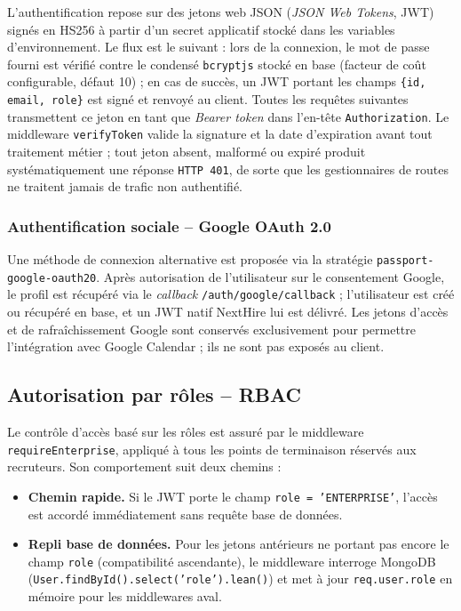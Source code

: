 L'authentification repose sur des jetons web JSON (\textit{JSON Web Tokens}, JWT) signés en
HS256 à partir d'un secret applicatif stocké dans les variables d'environnement. Le flux est le
suivant : lors de la connexion, le mot de passe fourni est vérifié contre le condensé
\texttt{bcryptjs} stocké en base (facteur de coût configurable, défaut 10) ; en cas de succès,
un JWT portant les champs \texttt{\{id, email, role\}} est signé et renvoyé au client. Toutes
les requêtes suivantes transmettent ce jeton en tant que \textit{Bearer token} dans l'en-tête
\texttt{Authorization}. Le middleware \texttt{verifyToken} valide la signature et la date
d'expiration avant tout traitement métier ; tout jeton absent, malformé ou expiré produit
systématiquement une réponse \texttt{HTTP 401}, de sorte que les gestionnaires de routes ne
traitent jamais de trafic non authentifié.

\subsubsection{Authentification sociale -- Google OAuth 2.0}

Une méthode de connexion alternative est proposée via la stratégie \texttt{passport-google-oauth20}.
Après autorisation de l'utilisateur sur le consentement Google, le profil est récupéré via le
\textit{callback} \texttt{/auth/google/callback} ; l'utilisateur est créé ou récupéré en base,
et un JWT natif NextHire lui est délivré. Les jetons d'accès et de rafraîchissement Google sont
conservés exclusivement pour permettre l'intégration avec Google Calendar ; ils ne sont pas
exposés au client.

\subsection{Autorisation par rôles -- RBAC}

Le contrôle d'accès basé sur les rôles est assuré par le middleware \texttt{requireEnterprise},
appliqué à tous les points de terminaison réservés aux recruteurs. Son comportement suit deux
chemins :

\begin{itemize}
  \item \textbf{Chemin rapide.} Si le JWT porte le champ \texttt{role = 'ENTERPRISE'},
        l'accès est accordé immédiatement sans requête base de données.
  \item \textbf{Repli base de données.} Pour les jetons antérieurs ne portant pas encore
        le champ \texttt{role} (compatibilité ascendante), le middleware interroge MongoDB
        (\texttt{User.findById().select('role').lean()}) et met à jour \texttt{req.user.role}
        en mémoire pour les middlewares aval.
\end{itemize}

